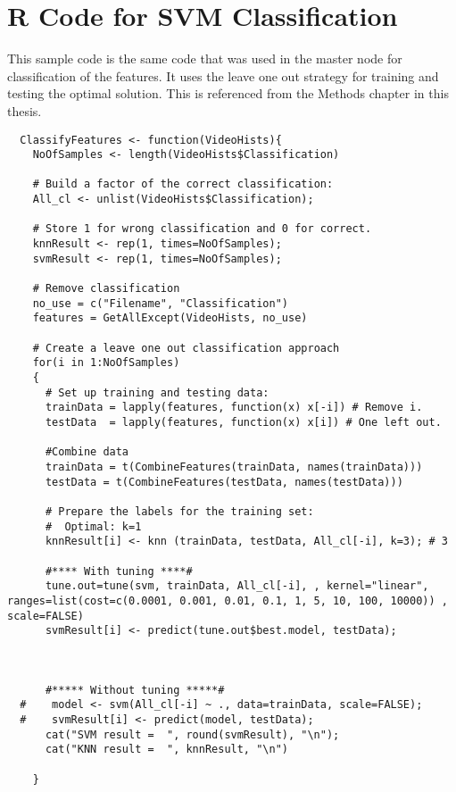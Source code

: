 \chapter{\label{ap:svm_classification}R Code for SVM Classification}
This sample code is the same code that was used in the master node for
classification of the features. It uses the leave one out strategy for
training and testing the optimal solution. This is referenced from the
Methods chapter in this thesis. 
\begin{verbatim}
  ClassifyFeatures <- function(VideoHists){
    NoOfSamples <- length(VideoHists$Classification)

    # Build a factor of the correct classification:
    All_cl <- unlist(VideoHists$Classification);

    # Store 1 for wrong classification and 0 for correct.
    knnResult <- rep(1, times=NoOfSamples);
    svmResult <- rep(1, times=NoOfSamples);

    # Remove classification
    no_use = c("Filename", "Classification")
    features = GetAllExcept(VideoHists, no_use)

    # Create a leave one out classification approach
    for(i in 1:NoOfSamples)
    {
      # Set up training and testing data:
      trainData = lapply(features, function(x) x[-i]) # Remove i.
      testData  = lapply(features, function(x) x[i]) # One left out.

      #Combine data
      trainData = t(CombineFeatures(trainData, names(trainData)))
      testData = t(CombineFeatures(testData, names(testData)))

      # Prepare the labels for the training set:
      #  Optimal: k=1
      knnResult[i] <- knn (trainData, testData, All_cl[-i], k=3); # 3

      #**** With tuning ****#
      tune.out=tune(svm, trainData, All_cl[-i], , kernel="linear", ranges=list(cost=c(0.0001, 0.001, 0.01, 0.1, 1, 5, 10, 100, 10000)) , scale=FALSE)
      svmResult[i] <- predict(tune.out$best.model, testData);



      #***** Without tuning *****#
  #    model <- svm(All_cl[-i] ~ ., data=trainData, scale=FALSE);
  #    svmResult[i] <- predict(model, testData);
      cat("SVM result =  ", round(svmResult), "\n");
      cat("KNN result =  ", knnResult, "\n")

    }
\end{verbatim}
